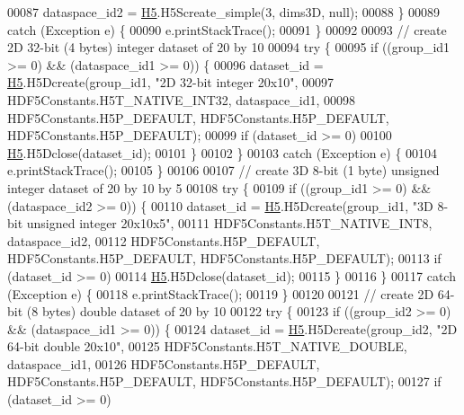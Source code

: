 \begin{DoxyCode}
00087             dataspace\_id2 = \hyperlink{namespace_h5}{H5}.H5Screate\_simple(3, dims3D, null);
00088         \}
00089         \textcolor{keywordflow}{catch} (Exception e) \{
00090             e.printStackTrace();
00091         \}
00092 
00093         \textcolor{comment}{// create 2D 32-bit (4 bytes) integer dataset of 20 by 10}
00094         \textcolor{keywordflow}{try} \{
00095             \textcolor{keywordflow}{if} ((group\_id1 >= 0) && (dataspace\_id1 >= 0)) \{
00096                 dataset\_id = \hyperlink{namespace_h5}{H5}.H5Dcreate(group\_id1, \textcolor{stringliteral}{"2D 32-bit integer 20x10"},
00097                         HDF5Constants.H5T\_NATIVE\_INT32, dataspace\_id1,
00098                         HDF5Constants.H5P\_DEFAULT, HDF5Constants.H5P\_DEFAULT, HDF5Constants.H5P\_DEFAULT);
00099                 \textcolor{keywordflow}{if} (dataset\_id >= 0)
00100                     \hyperlink{namespace_h5}{H5}.H5Dclose(dataset\_id);
00101             \}
00102         \}
00103         \textcolor{keywordflow}{catch} (Exception e) \{
00104             e.printStackTrace();
00105         \}
00106 
00107         \textcolor{comment}{// create 3D 8-bit (1 byte) unsigned integer dataset of 20 by 10 by 5}
00108         \textcolor{keywordflow}{try} \{
00109             \textcolor{keywordflow}{if} ((group\_id1 >= 0) && (dataspace\_id2 >= 0)) \{
00110                 dataset\_id = \hyperlink{namespace_h5}{H5}.H5Dcreate(group\_id1, \textcolor{stringliteral}{"3D 8-bit unsigned integer 20x10x5"},
00111                         HDF5Constants.H5T\_NATIVE\_INT8, dataspace\_id2,
00112                         HDF5Constants.H5P\_DEFAULT, HDF5Constants.H5P\_DEFAULT, HDF5Constants.H5P\_DEFAULT);
00113                 \textcolor{keywordflow}{if} (dataset\_id >= 0)
00114                     \hyperlink{namespace_h5}{H5}.H5Dclose(dataset\_id);
00115             \}
00116         \}
00117         \textcolor{keywordflow}{catch} (Exception e) \{
00118             e.printStackTrace();
00119         \}
00120 
00121         \textcolor{comment}{// create 2D 64-bit (8 bytes) double dataset of 20 by 10}
00122         \textcolor{keywordflow}{try} \{
00123             \textcolor{keywordflow}{if} ((group\_id2 >= 0) && (dataspace\_id1 >= 0)) \{
00124                 dataset\_id = \hyperlink{namespace_h5}{H5}.H5Dcreate(group\_id2, \textcolor{stringliteral}{"2D 64-bit double 20x10"},
00125                         HDF5Constants.H5T\_NATIVE\_DOUBLE, dataspace\_id1,
00126                         HDF5Constants.H5P\_DEFAULT, HDF5Constants.H5P\_DEFAULT, HDF5Constants.H5P\_DEFAULT);
00127                 \textcolor{keywordflow}{if} (dataset\_id >= 0)

\end{DoxyCode}

